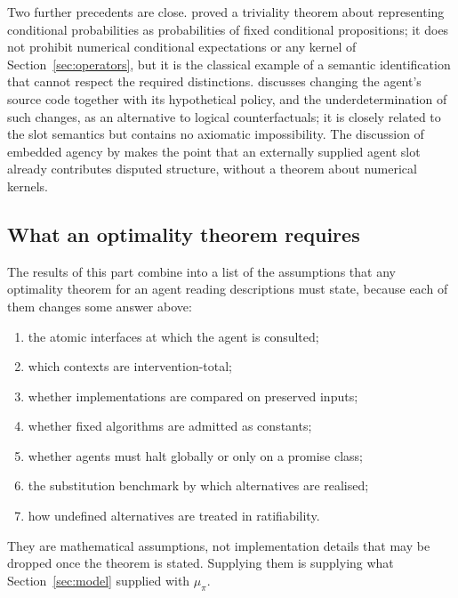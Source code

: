Two further precedents are close. \textcite{lewis1976} proved a triviality theorem about representing
conditional probabilities as probabilities of fixed conditional propositions; it does not prohibit
numerical conditional expectations or any kernel of Section~\ref{sec:operators}, but it is the classical
example of a semantic identification that cannot respect the required distinctions.
\textcite{taylor2020} discusses changing the agent's source code together with its hypothetical policy,
and the underdetermination of such changes, as an alternative to logical counterfactuals; it is closely
related to the slot semantics but contains no axiomatic impossibility. The discussion of embedded
agency by \textcite{demskigarrabrant2019} makes the point that an externally supplied agent slot already
contributes disputed structure, without a theorem about numerical kernels.

\subsection{What an optimality theorem requires}\label{sec:requirements}

The results of this part combine into a list of the assumptions that any optimality theorem for an
agent reading descriptions must state, because each of them changes some answer above:
\begin{enumerate}[label=(\roman*)]
  \item the atomic interfaces at which the agent is consulted;
  \item which contexts are intervention-total;
  \item whether implementations are compared on preserved inputs;
  \item whether fixed algorithms are admitted as constants;
  \item whether agents must halt globally or only on a promise class;
  \item the substitution benchmark by which alternatives are realised;
  \item how undefined alternatives are treated in ratifiability.
\end{enumerate}
They are mathematical assumptions, not implementation details that may be dropped once the theorem is
stated. Supplying them is supplying what Section~\ref{sec:model} supplied with $\mu_\pi$.
